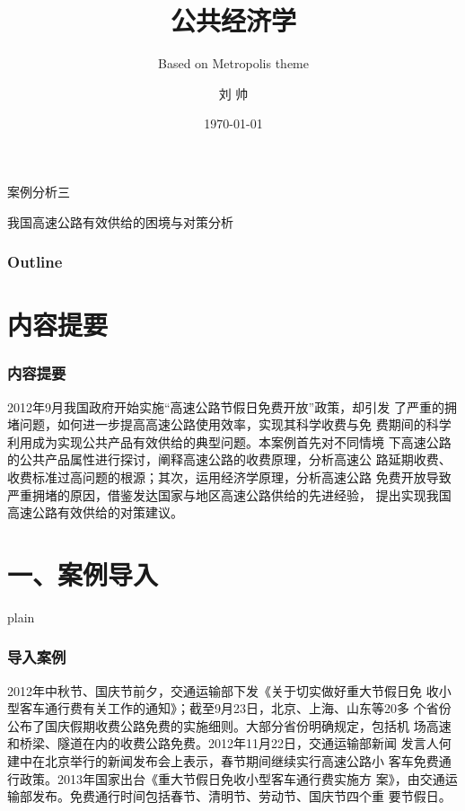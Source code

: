 \documentclass[aspectratio=169, 12pt]{beamer}
\title{公共经济学}
\subtitle{Based on Metropolis theme}
\author[LIU ShHUAI]{刘 {  } 帅}
\institute{山西师范大学 {  } 经济与管理学院}
\date{\today}
\begin{document}
\maketitle

\begin{frame}[standout]
    案例分析三\par
    \addtolength{\parskip}{.4em}
    我国高速公路有效供给的困境与对策分析
\end{frame}

\begin{frame}[plain]
    \frametitle{Outline}
    \tableofcontents[hideallsubsections]
  \end{frame}

\section{内容提要}

\begin{frame}[plain]
    \frametitle{内容提要}
    2012年9月我国政府开始实施“高速公路节假日免费开放”政策，却引发
了严重的拥堵问题，如何进一步提高高速公路使用效率，实现其科学收费与免
费期间的科学利用成为实现公共产品有效供给的典型问题。本案例首先对不同情境
下高速公路的公共产品属性进行探讨，阐释高速公路的收费原理，分析高速公
路延期收费、收费标准过高问题的根源；其次，运用经济学原理，分析高速公路
免费开放导致严重拥堵的原因，借鉴发达国家与地区高速公路供给的先进经验，
提出实现我国高速公路有效供给的对策建议。
\end{frame}

\section{一、案例导入}

\begin{frame}{plain}
    \frametitle{导入案例}
    2012年中秋节、国庆节前夕，交通运输部下发《关于切实做好重大节假日免
收小型客车通行费有关工作的通知》；截至9月23日，北京、上海、山东等20多
个省份公布了国庆假期收费公路免费的实施细则。大部分省份明确规定，包括机
场高速和桥梁、隧道在内的收费公路免费。2012年11月22日，交通运输部新闻
发言人何建中在北京举行的新闻发布会上表示，春节期间继续实行高速公路小
客车免费通行政策。2013年国家出台《重大节假日免收小型客车通行费实施方
案》，由交通运输部发布。免费通行时间包括春节、清明节、劳动节、国庆节四个重
要节假日。
\end{frame}
\end{document}
